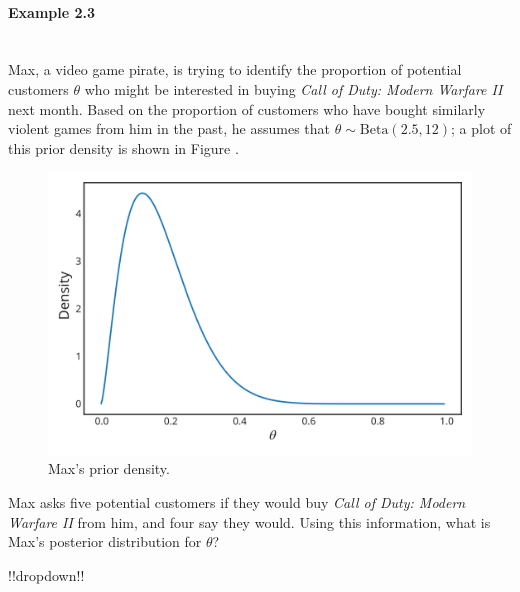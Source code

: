 \paragraph{Example 2.3}{~\\
Max, a video game pirate, is trying to identify the proportion of potential customers $\theta$ who might be interested in buying \textit{Call of Duty: Modern Warfare II} next month.  Based on the proportion of customers who have bought similarly violent games from him in the past, he assumes that $\theta \sim \mathrm{Beta}(2.5,12)$; a plot of this prior density is shown in Figure .  

\begin{figure}[h!]

\includegraphics{images/priorplot3.svg}
\caption{Max's prior density.}


\end{figure}
Max asks five potential customers if they would buy \textit{Call of Duty: Modern Warfare II} from him, and four say they would.  Using this information, what is Max's posterior distribution for $\theta$?   


!!dropdown!!

}
